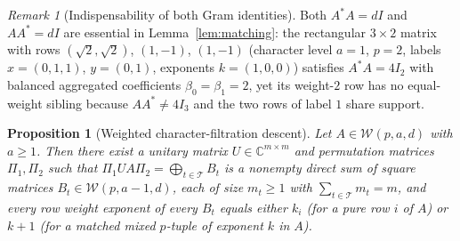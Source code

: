 \documentclass[11pt,reqno]{amsart}
\numberwithin{equation}{section}
\newtheorem{proposition}[theorem]{Proposition}
\theoremstyle{definition}
\theoremstyle{remark}
\newtheorem{remark}[theorem]{Remark}
\newcommand{\C}{\mathbb{C}}
\begin{document}
\begin{remark}[Indispensability of both Gram identities]
\label{rem:both-grams}
Both $A^*A=dI$ and $AA^*=dI$ are essential in Lemma~\ref{lem:matching}: the rectangular $3\times 2$ matrix with rows $(\sqrt{2},\sqrt{2})$, $(1,-1)$, $(1,-1)$ (character level $a=1$, $p=2$, labels $x=(0,1,1)$, $y=(0,1)$, exponents $k=(1,0,0)$) satisfies $A^*A=4I_2$ with balanced aggregated coefficients $\beta_0=\beta_1=2$, yet its weight-$2$ row has no equal-weight sibling because $AA^*\neq 4I_3$ and the two rows of label $1$ share support.
\end{remark}

\begin{proposition}[Weighted character-filtration descent]
\label{prop:descent}
Let $A\in\mathcal{W}(p,a,d)$ with $a\ge 1$. Then there exist a unitary matrix $U\in\C^{m\times m}$ and permutation matrices $\Pi_1,\Pi_2$ such that $\Pi_1 U A \Pi_2 = \bigoplus_{t\in\mathcal{T}} B_t$ is a nonempty direct sum of square matrices $B_t\in\mathcal{W}(p,a-1,d)$, each of size $m_t\ge 1$ with $\sum_{t\in\mathcal{T}} m_t = m$, and every row weight exponent of every $B_t$ equals either $k_i$ (for a pure row $i$ of $A$) or $k+1$ (for a matched mixed $p$-tuple of exponent $k$ in $A$).
\end{proposition}
\end{document}
